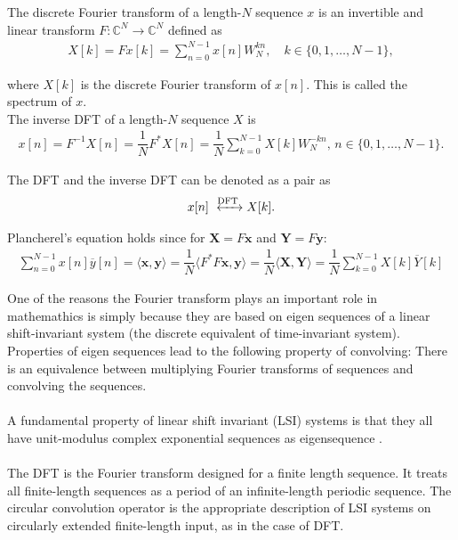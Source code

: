 \begin{definition}
The discrete Fourier transform of a length-$N$ sequence $x$ is an invertible and linear transform $F: \mathbb{C}^N \to \mathbb{C}^N$ defined as
\begin{align} \label{eq:def_DFT}
	X[k] = Fx[k] = \sum_{n=0}^{N-1} x[n] W_N^{kn}, \quad k\in \{0, 1, \dots, N-1\},
\end{align}

where $X[k]$ is the discrete Fourier transform of $x[n]$. This is called the spectrum of $x$. \\
The inverse DFT of a length-$N$ sequence $X$ is
\begin{align*}
	x[n] = F^{-1}X[n] = \dfrac{1}{N} F^*X[n] = \dfrac{1}{N}\sum_{k=0}^{N-1} X[k] W_N^{-kn}, \, n \in \{0,1,\dots,N-1\}.
\end{align*}

The DFT and the inverse DFT can be denoted as a pair as
\begin{align*}
	x[n] \xleftrightarrow{\text{DFT}} X[k].
\end{align*}
\end{definition}

Plancherel's equation holds since for $\textbf{X} = F\textbf{x}$ and $\textbf{Y} = F\textbf{y}$:
\begin{align*}
\sum_{n=0}^{N-1} x[n] \overline{y}[n] = \langle \textbf{x},\textbf{y} \rangle = \dfrac{1}{N} \langle F^*F\textbf{x},\textbf{y} \rangle = \dfrac{1}{N} \langle \textbf{X},\textbf{Y} \rangle = \dfrac{1}{N} \sum_{k=0}^{N-1} X[k] \overline{Y}[k]
\end{align*}

One of the reasons the Fourier transform plays an important role in mathemathics is simply because they are based on eigen sequences of a linear shift-invariant system (the discrete equivalent of time-invariant system).
Properties of eigen sequences lead to the following property of convolving:
There is an equivalence between multiplying Fourier transforms of sequences and convolving the sequences.
\\\\
 A fundamental property of linear shift invariant (LSI) systems is that they all have unit-modulus complex exponential sequences as eigensequence \cite{FSP}.
\\\\
The DFT is the Fourier transform designed for a finite length sequence.
It treats all finite-length sequences as a period of an infinite-length periodic sequence.
The circular convolution operator is the appropriate description of LSI systems on circularly extended finite-length input, as in the case of DFT. 

